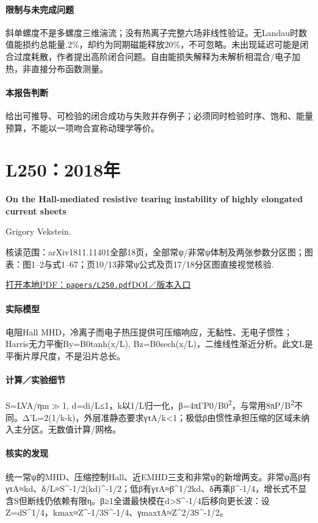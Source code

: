 \paragraph{限制与未完成问题}斜单螺度不是多螺度三维湍流；没有热离子完整六场非线性验证。无Landau时数值能损约总能量.2\%，却约为同期磁能释放20\%，不可忽略。未出现延迟可能是闭合过度耗散，作者提出高阶闭合问题。自由能损失解释为未解析相混合/电子加热，非直接分布函数测量。

\paragraph{本报告判断}给出可推导、可检验的闭合成功与失败并存例子；必须同时检验时序、饱和、能量预算，不能以一项吻合宣称动理学等价。

\section{L250：2018年}\label{paper:L250}

\textbf{On the Hall-mediated resistive tearing instability of highly elongated current sheets}\citep{L250}\

Grigory Vekstein.

\textsf{核读范围：}arXiv1811.11401全部18页，全部常ψ/非常ψ体制及两张参数分区图；\textsf{图表：}图1–2与式1–67；页10/13非常ψ公式及页17/18分区图直接视觉核验.

\href{run:papers/L250.pdf}{打开本地PDF：\texttt{papers/L250.pdf}}\quad\href{https://arxiv.org/abs/1811.11401}{DOI／版本入口}

\paragraph{实际模型}电阻Hall MHD，冷离子而电子热压提供可压缩响应，无黏性、无电子惯性；Harris无力平衡By=B0tanh(x/L), Bz=B0sech(x/L)，二维线性渐近分析。此文L是平衡片厚尺度，不是沿片总长。

\paragraph{计算／实验细节}S=LVA/ηm\ensuremath{\gg}1, d=di/L≤1，k以1/L归一化，β=4πΓP0/B0\textsuperscript{2}，与常用8πP/B\textsuperscript{2}不同。Δ'L=2(1/k-k)，外层准静态要求γτA/k<1；极低β由惯性承担压缩的区域未纳入主分区。无数值计算/网格。

\paragraph{核实的发现}统一常ψ的MHD、压缩控制Hall、近EMHD三支和非常ψ的新增两支。非常ψ高β有γτA≈kd、δ/L≈S\textasciicircum{}-1/2(kd)\textasciicircum{}-1/2；低β有γτA≈β\textasciicircum{}1/2kd、δ再乘β\textasciicircum{}-1/4，增长式不显含S但断线仍依赖有限η。β≥1全谱最快模在d>S\textasciicircum{}-1/4后移向更长波：设Z=dS\textasciicircum{}1/4，kmax≈Z\textasciicircum{}-1/3S\textasciicircum{}-1/4、γmaxτA≈Z\textasciicircum{}2/3S\textasciicircum{}-1/2。

